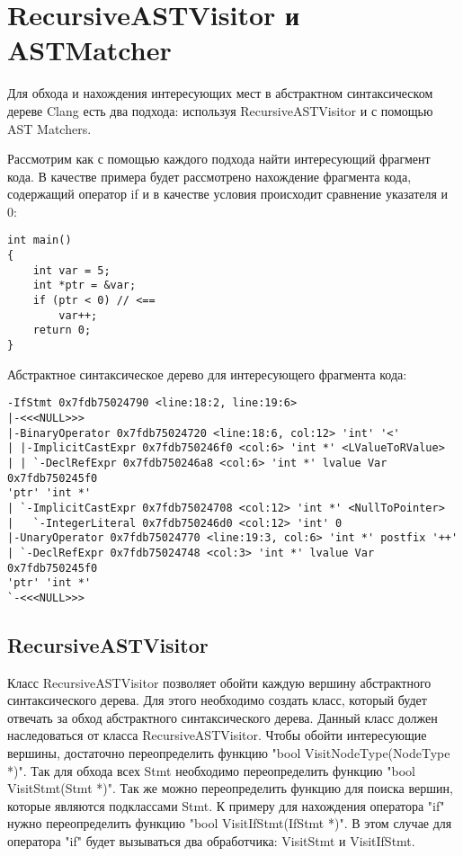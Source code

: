 \section{RecursiveASTVisitor и ASTMatcher}
Для обхода и нахождения интересующих мест в абстрактном синтаксическом дереве Clang есть два подхода:
используя RecursiveASTVisitor и с помощью AST Matchers.

Рассмотрим как с помощью каждого подхода найти интересующий фрагмент кода. В качестве примера
будет рассмотрено нахождение фрагмента кода, содержащий оператор if и в качестве условия 
происходит сравнение указателя и 0:
\begin{lstlisting}
int main()
{
	int var = 5;
	int *ptr = &var;
	if (ptr < 0) // <==
		var++;
	return 0;
}
\end{lstlisting}

Абстрактное синтаксическое дерево для интересующего фрагмента кода:
\begin{lstlisting}[basicstyle=\tiny]
-IfStmt 0x7fdb75024790 <line:18:2, line:19:6>
|-<<<NULL>>>
|-BinaryOperator 0x7fdb75024720 <line:18:6, col:12> 'int' '<'
| |-ImplicitCastExpr 0x7fdb750246f0 <col:6> 'int *' <LValueToRValue>
| | `-DeclRefExpr 0x7fdb750246a8 <col:6> 'int *' lvalue Var 0x7fdb750245f0 
'ptr' 'int *'
| `-ImplicitCastExpr 0x7fdb75024708 <col:12> 'int *' <NullToPointer>
|   `-IntegerLiteral 0x7fdb750246d0 <col:12> 'int' 0
|-UnaryOperator 0x7fdb75024770 <line:19:3, col:6> 'int *' postfix '++'
| `-DeclRefExpr 0x7fdb75024748 <col:3> 'int *' lvalue Var 0x7fdb750245f0 
'ptr' 'int *'
`-<<<NULL>>>
\end{lstlisting}

\subsection*{RecursiveASTVisitor}
Класс RecursiveASTVisitor позволяет обойти каждую вершину абстрактного синтаксического дерева.
Для этого необходимо создать класс, который будет отвечать за обход абстрактного синтаксического 
дерева. Данный класс должен наследоваться от класса RecursiveASTVisitor. Чтобы обойти интересующие вершины,
достаточно переопределить функцию "bool VisitNodeType(NodeType *)". Так для обхода всех Stmt 
необходимо переопределить функцию "bool VisitStmt(Stmt *)". Так же можно переопределить функцию
для поиска вершин, которые являются подклассами Stmt. К примеру для нахождения оператора "if"
нужно переопределить функцию "bool VisitIfStmt(IfStmt *)". В этом случае для оператора "if" 
будет вызываться два обработчика: VisitStmt и VisitIfStmt.


